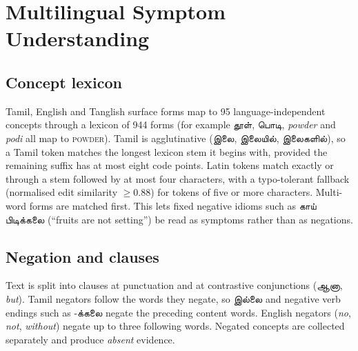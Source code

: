 \documentclass[conference]{IEEEtran}
\newcommand{\ta}[1]{{\tamilfont #1}}
\begin{document}
\section{Multilingual Symptom Understanding}
\label{sec:nlu}

\subsection{Concept lexicon}
Tamil, English and Tanglish surface forms map to 95 language-independent concepts through a lexicon of 944 forms (for example \ta{தூள்}, \ta{பொடி}, \emph{powder} and \emph{podi} all map to \textsc{powder}). Tamil is agglutinative (\ta{இலை}, \ta{இலையில்}, \ta{இலைகளில்}), so a Tamil token matches the longest lexicon stem it begins with, provided the remaining suffix has at most eight code points. Latin tokens match exactly or through a stem followed by at most four characters, with a typo-tolerant fallback (normalised edit similarity $\geq 0.88$) for tokens of five or more characters. Multi-word forms are matched first. This lets fixed negative idioms such as \ta{காய் பிடிக்கலை} (``fruits are not setting'') be read as symptoms rather than as negations.

\subsection{Negation and clauses}
Text is split into clauses at punctuation and at contrastive conjunctions (\ta{ஆனா}, \emph{but}). Tamil negators follow the words they negate, so \ta{இல்லை} and negative verb endings such as \mbox{\ta{-க்கலை}} negate the preceding content words. English negators (\emph{no}, \emph{not}, \emph{without}) negate up to three following words. Negated concepts are collected separately and produce \emph{absent} evidence.
\end{document}
